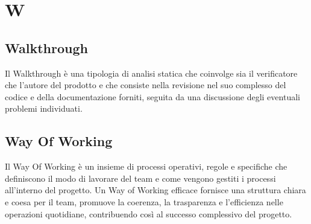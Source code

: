 \section{W} 
\subsection{Walkthrough} 
Il Walkthrough è una tipologia di analisi statica che coinvolge sia il verificatore che l’autore del prodotto e che consiste nella revisione nel suo complesso del codice e della documentazione forniti, seguita da una discussione degli eventuali problemi individuati.
\subsection{Way Of Working} 
Il Way Of Working è un insieme di processi operativi, regole e specifiche che definiscono il modo di lavorare del team e come vengono gestiti i processi all'interno del progetto. Un Way of Working efficace fornisce una struttura chiara e coesa per il team, promuove la coerenza, la trasparenza e l'efficienza nelle operazioni quotidiane, contribuendo così al successo complessivo del progetto.
